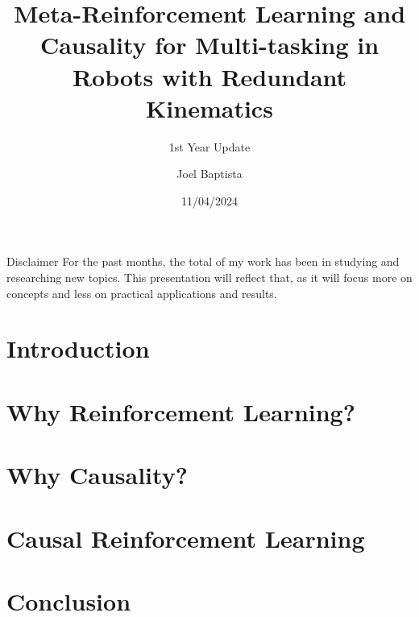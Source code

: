 \documentclass[10pt,xcolor={dvipsnames}]{beamer}
\title[]
{\large Meta-Reinforcement Learning and Causality for Multi-tasking in Robots with Redundant Kinematics}
\subtitle{1st Year Update}
\author[Joel Baptista] %
{Joel Baptista}
\date[2024/04/11] %
{11/04/2024}
\begin{document}
\frame{\titlepage}



\begin{frame}{Disclaimer}
  For the past months, the total of my work has been in studying and researching new topics. 
  This presentation will reflect that, as it will focus more on concepts and less
  on practical applications and results.
\end{frame}
\section{Introduction}


\section{Why Reinforcement Learning?}


\section{Why Causality?}


\section{Causal Reinforcement Learning}



\section{Conclusion}




\end{document}

